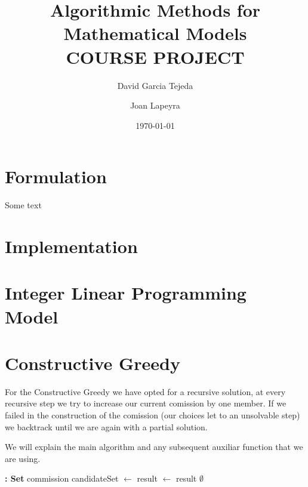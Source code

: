 \documentclass{article}
\title{%
  Algorithmic Methods for Mathematical Models\\
  \large COURSE PROJECT }
\author{David Garcia Tejeda \and Joan Lapeyra}
\date{\today}
\begin{document}
\maketitle

\section{Formulation}
Some text
\section{Implementation}
\section{Integer Linear Programming Model}
\section{Constructive Greedy}

For the Constructive Greedy we have opted for a recursive solution, at every recursive step we try to increase our current comission by one member. If we failed in the construction of the comission (our choices let to an unsolvable step) we backtrack until we are again with a partial solution.

We will explain the main algorithm and any subsequent auxiliar function that we are using.

\begin{algorithm}
\begin{algorithmic}[H]
 \textbf{: Set}
        \State \Return commission
    \EndIf
    \State candidateSet $\gets$ 
        \State result $\gets$ 
            \State \Return result
        \EndIf
    \EndFor
    \State \Return $\emptyset$
\EndFunction
\end{algorithmic}
\end{algorithm}
\end{document}
